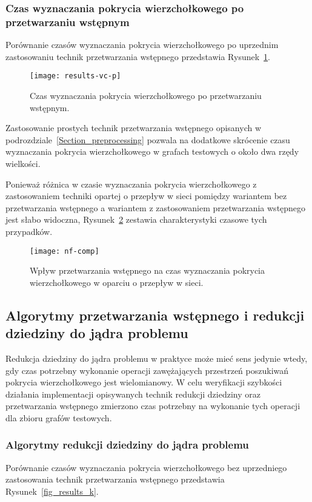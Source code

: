 \subsubsection{\textbf{Czas wyznaczania pokrycia wierzchołkowego po przetwarzaniu wstępnym}}

  Porównanie czasów wyznaczania pokrycia wierzchołkowego po uprzednim zastosowaniu technik przetwarzania wstępnego przedstawia Rysunek~\ref{fig_results_vc_p}.
  \begin{figure}
    \caption{Czas wyznaczania pokrycia wierzchołkowego po przetwarzaniu wstępnym.}
    \label{fig_results_vc_p}
    \centering
      \texttt{[image: results-vc-p]}
  \end{figure}
  Zastosowanie prostych technik przetwarzania wstępnego opisanych w podrozdziale~\ref{Section_preprocessing} pozwala na dodatkowe skrócenie czasu wyznaczania pokrycia wierzchołkowego w grafach testowych o około dwa rzędy wielkości.

  Ponieważ różnica w czasie wyznaczania pokrycia wierzchołkowego z zastosowaniem techniki opartej o przepływ w sieci pomiędzy wariantem bez przetwarzania wstępnego a wariantem z zastosowaniem przetwarzania wstępnego jest słabo widoczna, Rysunek~\ref{fig_nf_comp} zestawia charakterystyki czasowe tych przypadków.
  \begin{figure}
    \caption{Wpływ przetwarzania wstępnego na czas wyznaczania pokrycia wierzchołkowego w oparciu o przepływ w sieci.}
    \label{fig_nf_comp}
    \centering
      \texttt{[image: nf-comp]}
  \end{figure}

\subsection{Algorytmy przetwarzania wstępnego i redukcji dziedziny do jądra problemu}
  Redukcja dziedziny do jądra problemu w praktyce może mieć sens jedynie wtedy, gdy czas potrzebny wykonanie operacji zawężających przestrzeń poszukiwań pokrycia wierzchołkowego jest wielomianowy.
  W celu weryfikacji szybkości działania implementacji opisywanych technik redukcji dziedziny oraz przetwarzania wstępnego zmierzono czas potrzebny na wykonanie tych operacji dla zbioru grafów testowych. 

\subsubsection{\textbf{Algorytmy redukcji dziedziny do jądra problemu}}
  Porównanie czasów wyznaczania pokrycia wierzchołkowego bez uprzedniego zastosowania technik przetwarzania wstępnego przedstawia Rysunek~\ref{fig_results_k}.

